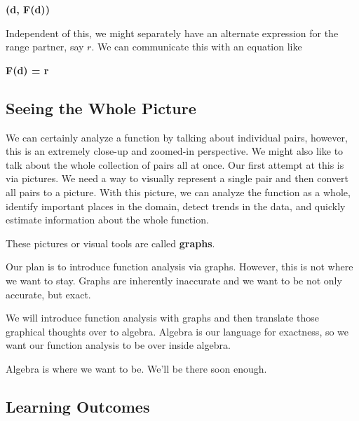 \documentclass{ximera}
\begin{document}
\begin{center}
\textbf{\textcolor{purple!85!blue}{(d, F(d))}}
\end{center}




Independent of this, we might separately have an alternate expression for the range partner, say $r$.  We can communicate this with an equation like




\begin{center}
\textbf{\textcolor{purple!85!blue}{F(d) = r}}
\end{center}


\subsection*{Seeing the Whole Picture}

We can certainly analyze a function by talking about individual pairs, however, this is an extremely close-up and zoomed-in perspective. We might also like to talk about the whole collection of pairs all at once.  Our first attempt at this is via pictures. We need a way to visually represent a single pair and then convert all pairs to a picture.  With this picture, we can analyze the function as a whole, identify important places in the domain, detect trends in the data, and quickly estimate information about the whole function. 

These pictures or visual tools are called \textbf{\textcolor{blue!55!black}{graphs}}. 


Our plan is to introduce function analysis via graphs.  However, this is not where we want to stay.  Graphs are inherently inaccurate and we want to be not only accurate, but exact.  

We will introduce function analysis with graphs and then translate those graphical thoughts over to algebra. Algebra is our language for exactness, so we want our function analysis to be over inside algebra. 

Algebra is where we want to be.  We'll be there soon enough. 



\subsection*{Learning Outcomes}
\end{document}
